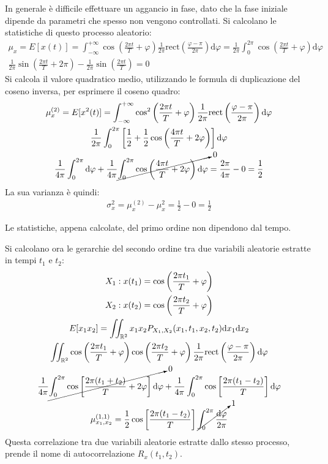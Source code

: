 \documentclass{article}
\newcommand{\rect}{\mathrm{rect}}
\newcommand{\df}{\mathrm{d}}
\numberwithin{equation}{subsection}
\begin{document}
In generale è difficile effettuare un aggancio in fase, dato che la fase iniziale dipende da parametri che spesso non vengono controllati. 
Si calcolano le statistiche di questo processo aleatorio:
\begin{gather*}
    \mu_{x}=E[x(t)]=\displaystyle\int_{-\infty}^{+\infty}\cos\left(\frac{2\pi t}{T}+\varphi\right)\frac{1}{2\pi}\rect\left(\frac{\varphi-\pi}{2\pi}\right)\df\varphi=\frac{1}{2\pi}\int_0^{2\pi}\cos\left(\frac{2\pi t}{T}+\varphi\right)\df\varphi\\
    \frac{1}{2\pi}\sin\left(\frac{2\pi t}{T}+2\pi\right)-\frac{1}{2\pi}\sin\left(\frac{2\pi t}{T}\right)=0
\end{gather*}
Si calcola il valore quadratico medio, utilizzando le formula di duplicazione del coseno inversa, per esprimere il coseno quadro:
\begin{gather*}
    \mu_{x}^{(2)}=E[x^2(t)]=\displaystyle\int_{-\infty}^{+\infty}\cos^2\left(\frac{2\pi t}{T}+\varphi\right)\frac{1}{2\pi}\rect\left(\frac{\varphi-\pi}{2\pi}\right)\df\varphi\\
    \frac{1}{2\pi}\int_0^{2\pi}\left[\frac{1}{2}+\frac{1}{2}\cos\left(\frac{4\pi t}{T}+2\varphi\right)\right]\df\varphi\\
    \frac{1}{4\pi}\int_0^{2\pi}\df\varphi+\frac{1}{4\pi}\cancelto{0}{\int_0^{2\pi}\cos\left(\frac{4\pi t}{T}+2\varphi\right)\df\varphi}=\frac{2\pi}{4\pi}-0=\frac{1}{2}
\end{gather*}
La sua varianza è quindi:
\begin{gather*}
    \sigma_x^2=\mu_x^{(2)}-\mu_x^2=\displaystyle\frac{1}{2}-0=\frac{1}{2}
\end{gather*}

Le statistiche, appena calcolate, del primo ordine non dipendono dal tempo. 

Si calcolano ora le gerarchie del secondo ordine tra due variabili aleatorie estratte in tempi $t_1$ e $t_2$:
\begin{gather*}
    X_1:x(t_1)=\displaystyle\cos\left(\frac{2\pi t_1}{T}+\varphi\right)\\
    X_2:x(t_2)=\displaystyle\cos\left(\frac{2\pi t_2}{T}+\varphi\right)\\
    E[x_1x_2]=\displaystyle\iint_{\mathbb{R}^2}x_1x_2P_{X_1,X_2}(x_1,t_1,x_2,t_2)\df x_1\df x_2\\
    \displaystyle\iint_{\mathbb{R}^2}\cos\left(\frac{2\pi t_1}{T}+\varphi\right)\cos\left(\frac{2\pi t_2}{T}+\varphi\right)\frac{1}{2\pi}\rect\left(\frac{\varphi-\pi}{2\pi}\right)\df\varphi\\
    \displaystyle\frac{1}{4\pi}\cancelto{0}{\int_{0}^{2\pi}\cos\left[\frac{2\pi(t_1+t_2)}{T}+2\varphi\right]\df\varphi}+\frac{1}{4\pi}\int_{0}^{2\pi}\cos\left[\frac{2\pi(t_1-t_2)}{T}\right]\df\varphi\\
    \mu_{x_1,x_2}^{(1,1)}=\displaystyle\frac{1}{2}\cos\left[\frac{2\pi(t_1-t_2)}{T}\right]\cancelto{1}{\int_0^{2\pi}\frac{\df\varphi}{2\pi}}
\end{gather*}
Questa correlazione tra due variabili aleatorie estratte dallo stesso processo, prende il nome di autocorrelazione $R_{x}(t_1,t_2)$.
\end{document}
